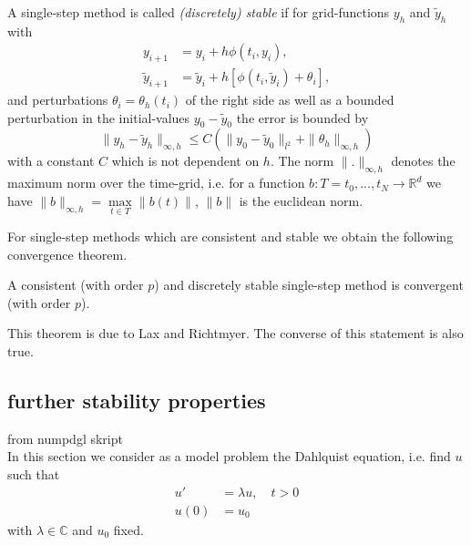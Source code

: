 	\begin{definition}\label{Discrete_Stability_SingleStep - lecture notes for numpdgl}
		A single-step method is called \emph{(discretely) stable} if for grid-functions $y_h$ and $\tilde{y}_h$ with
		\begin{align}
			y_{i+1} &= y_i + h \phi(t_i, y_i), \\
			\tilde{y}_{i+1} &=  \tilde{y}_i + h [\phi(t_i, \tilde{y}_i) + \theta_i],
		\end{align}
		and perturbations $\theta_i = \theta_h(t_i)$ of the right side as well as a bounded perturbation in the initial-values $y_0 - \tilde{y}_0$ the error is bounded by
		\begin{displaymath}
			\|y_h - \tilde{y}_h\|_{\infty,h} \leq C (\|y_0 - \tilde{y}_0\|_{l^2} + \|\theta_h\|_{\infty,h})
		\end{displaymath}
		with a constant $C$ which is not dependent on $h$. The norm $\|.\|_{\infty,h}$ denotes the maximum norm over the time-grid, i.e. for a function $b: T={t_0,...,t_N} \to \mathbb{R}^d$ we have $\|b\|_{\infty,h} = \max\limits_{t \in T}\|b(t)\|$, $\|b\|$ is the euclidean norm.
	\end{definition}
	
	For single-step methods which are consistent and stable we obtain the following convergence theorem.
	
	\begin{theorem}\label{Lax-Richtmyer}
		A consistent (with order $p$) and discretely stable single-step method is convergent (with order $p$).
	\end{theorem}
	
	This theorem is due to Lax and Richtmyer. The converse of this statement is also true. 

	\subsection{further stability properties}
		from numpdgl skript \\
		In this section we consider as a model problem the Dahlquist equation, i.e. find $u$ such that
		\begin{align}
			u' &= \lambda u, \quad t > 0 \\
			u(0) &= u_0
		\end{align}
		with $\lambda \in \mathbb{C}$ and $u_0$ fixed.
		
